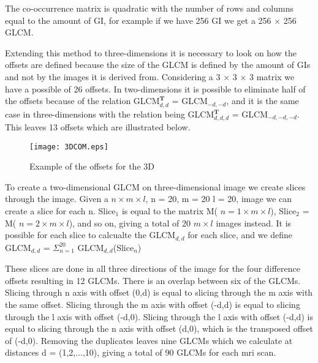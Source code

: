 The co-occurrence matrix is quadratic with the number of rows and columns equal to the amount of GI, for example if we have 256 GI we get a 256 $\times$ 256 GLCM.

Extending this method to three-dimensions it is necessary to look on how the offsets are defined because the size of the GLCM is defined by the amount of GIs and not by the images it is derived from. Considering a 3 $\times$ 3 $\times$ 3 matrix we have a possible of 26 offsets. In two-dimensions it is possible to eliminate half of the offsets because of the relation GLCM$_{d,d}^\textbf{T}$ = GLCM$_{-d,-d}$, and it is the same case in three-dimensions with the relation being GLCM$_{d,d,d}^\textbf{T}$ = GLCM$_{-d,-d,-d}$. This leaves 13 offsets which are illustrated below.\\

\begin{figure}[H]
  \centering
  \texttt{[image: 3DCOM.eps]}
  \caption{Example of the offsets for the 3D}\label{3DCOM}
\end{figure}



To create a two-dimensional GLCM on three-dimensional image we create slices through the image. Given a $n \times m \times l$, n = 20, m = 20 l = 20, image we can create a slice for each n. Slice$_1$ is equal to the matrix M( $n = 1 \times m \times l$), Slice$_2$ = M( $n = 2 \times m \times l$), and so on, giving a total of 20 $m \times l$ images instead. It is possible for each slice to calcualte the GLCM$_{d,d}$ for each slice, and we define GLCM$_{d,d}$ = $ \Sigma_{n=1}^20$ GLCM$_{d,d}$(Slice$_n$)

These slices are done in all three directions of the image for the four difference offsets resulting in 12 GLCMs. There is an overlap between six of the GLCMs. Slicing through n axis with offset (0,d) is equal to slicing through the m axis with the same offset. Slicing through the m axis with offset (-d,d) is equal to slicing through the l axis with offset (-d,0). Slicing through the l axis with offset (-d,d) is equal to slicing through the n axis with offset (d,0), which is the transposed offset of (-d,0). Removing the duplicates leaves nine GLCMs which we calculate at distances d = (1,2,...,10), giving a total of 90 GLCMs for each mri scan.

